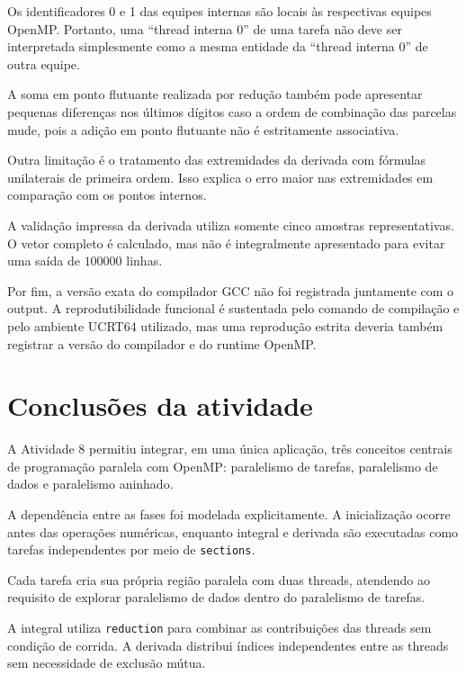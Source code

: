 Os identificadores 0 e 1 das equipes internas são locais às respectivas
equipes OpenMP. Portanto, uma ``thread interna 0'' de uma tarefa não deve ser
interpretada simplesmente como a mesma entidade da ``thread interna 0'' de
outra equipe.

A soma em ponto flutuante realizada por redução também pode apresentar
pequenas diferenças nos últimos dígitos caso a ordem de combinação das
parcelas mude, pois a adição em ponto flutuante não é estritamente
associativa.

Outra limitação é o tratamento das extremidades da derivada com fórmulas
unilaterais de primeira ordem. Isso explica o erro maior nas extremidades em
comparação com os pontos internos.

A validação impressa da derivada utiliza somente cinco amostras
representativas. O vetor completo é calculado, mas não é integralmente
apresentado para evitar uma saída de $100000$ linhas.

Por fim, a versão exata do compilador GCC não foi registrada juntamente com o
output. A reprodutibilidade funcional é sustentada pelo comando de compilação
e pelo ambiente UCRT64 utilizado, mas uma reprodução estrita deveria também
registrar a versão do compilador e do runtime OpenMP.


\section{Conclusões da atividade}
\label{sec:atvd08-conclusao}

A Atividade 8 permitiu integrar, em uma única aplicação, três conceitos
centrais de programação paralela com OpenMP: paralelismo de tarefas,
paralelismo de dados e paralelismo aninhado.

A dependência entre as fases foi modelada explicitamente. A inicialização
ocorre antes das operações numéricas, enquanto integral e derivada são
executadas como tarefas independentes por meio de \texttt{sections}.

Cada tarefa cria sua própria região paralela com duas threads, atendendo ao
requisito de explorar paralelismo de dados dentro do paralelismo de tarefas.

A integral utiliza \texttt{reduction} para combinar as contribuições das
threads sem condição de corrida. A derivada distribui índices independentes
entre as threads sem necessidade de exclusão mútua.

